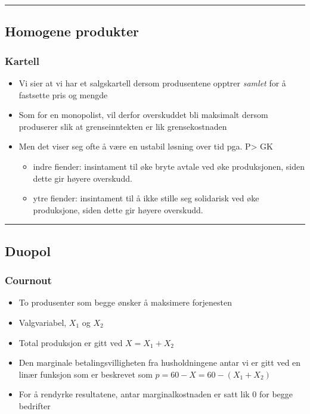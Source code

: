\documentclass[
  letterpaper,
  DIV=11,
  numbers=noendperiod]{scrartcl}
\providecommand{\tightlist}{%
  \setlength{\itemsep}{0pt}\setlength{\parskip}{0pt}}\usepackage{longtable,booktabs,array}
\begin{document}
\begin{center}\rule{0.5\linewidth}{0.5pt}\end{center}

\subsection{Homogene produkter}\label{homogene-produkter}

\subsubsection{Kartell}\label{kartell}

\begin{itemize}
\tightlist
\item
  Vi sier at vi har et salgskartell dersom produsentene opptrer
  \emph{samlet} for å fastsette pris og mengde
\item
  Som for en monopolist, vil derfor overskuddet bli maksimalt dersom
  produserer slik at grenseinntekten er lik grensekostnaden
\item
  Men det viser seg ofte å være en ustabil løsning over tid pga.
  P\textgreater{} GK

  \begin{itemize}
  \tightlist
  \item
    indre fiender: insintament til øke bryte avtale ved øke
    produksjonen, siden dette gir høyere overskudd.
  \item
    ytre fiender: insintament til å ikke stille seg solidarisk ved øke
    produksjone, siden dette gir høyere overskudd.
  \end{itemize}
\end{itemize}

\begin{center}\rule{0.5\linewidth}{0.5pt}\end{center}

\subsection{Duopol}\label{duopol}

\subsubsection{Cournout}\label{cournout}

\begin{itemize}
\tightlist
\item
  To produsenter som begge ønsker å maksimere forjenesten
\item
  Valgvariabel, \(X_{1}\) og \(X_{2}\)
\item
  Total produksjon er gitt ved \(X=X_{1}+X_{2}\)
\item
  Den marginale betalingsvilligheten fra husholdningene antar vi er gitt
  ved en linær funksjon som er beskrevet som \(p=60-X=60-(X_{1}+X_{2})\)
\item
  For å rendyrke resultatene, antar marginalkostnaden er satt lik 0 for
  begge bedrifter
\end{itemize}
\end{document}
